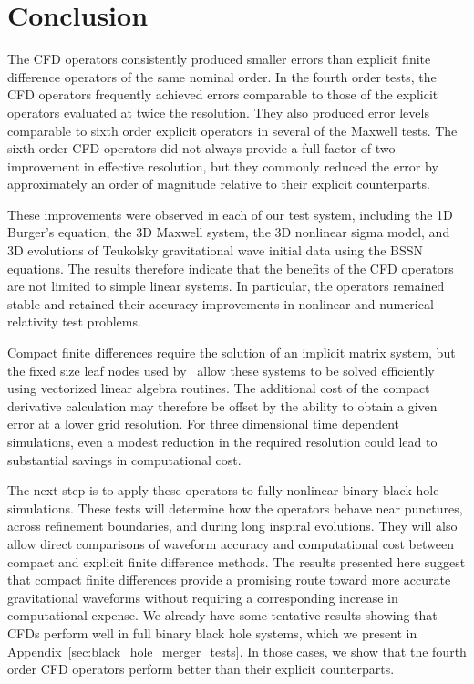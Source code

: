 \section{Conclusion}
\label{sec:conclusion}

The CFD operators consistently produced smaller errors than explicit
finite difference operators of the same nominal order. In the fourth order
tests, the CFD operators frequently achieved errors comparable to those
of the explicit operators evaluated at twice the resolution. They also
produced error levels comparable to sixth order explicit operators in several
of the Maxwell tests. The sixth order CFD operators did not always provide
a full factor of two improvement in effective resolution, but they commonly
reduced the error by approximately an order of magnitude relative to their
explicit counterparts.

These improvements were observed in each of our test system, including the 1D Burger's equation, the 3D Maxwell system, the 3D nonlinear sigma
model, and 3D evolutions of Teukolsky gravitational wave initial data using the
BSSN equations. The results therefore indicate that the benefits of the
CFD operators are not limited to simple linear systems. In particular,
the operators remained stable and retained their accuracy improvements in
nonlinear and numerical relativity test problems.

Compact finite differences require the solution of an implicit matrix system,
but the fixed size leaf nodes used by \dendrogr\ allow these systems to be
solved efficiently using vectorized linear algebra routines. The additional
cost of the compact derivative calculation may therefore be offset by the
ability to obtain a given error at a lower grid resolution. For
three dimensional time dependent simulations, even a modest reduction in the
required resolution could lead to substantial savings in computational cost.

The next step is to apply these operators to fully nonlinear binary black hole
simulations. These tests will determine how the operators
behave near punctures, across refinement boundaries, and during long
inspiral evolutions. They will also allow direct comparisons of waveform
accuracy and computational cost between compact and explicit finite
difference methods. The results presented here suggest that compact finite
differences provide a promising route toward more accurate gravitational
waveforms without requiring a corresponding increase in computational
expense. We already have some tentative results showing that CFDs perform well
in full binary black hole systems, which we present in
Appendix~\ref{sec:black_hole_merger_tests}. In those cases, we show that the
fourth order CFD operators perform better than their explicit counterparts.
